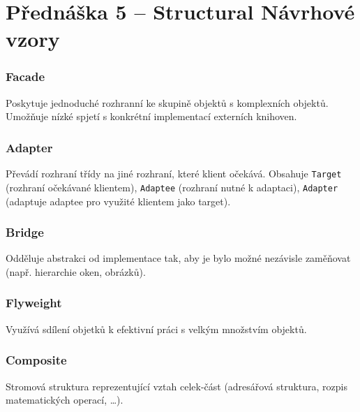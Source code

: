 \section{Přednáška 5 -- Structural Návrhové vzory}

\subsubsection{Facade}

Poskytuje jednoduché rozhranní ke skupině objektů s komplexních objektů.
Umožňuje nízké spjetí s konkrétní implementací externích knihoven.

\subsubsection{Adapter}

Převádí rozhraní třídy na jiné rozhraní, které klient očekává.
Obsahuje \texttt{Target} (rozhraní očekávané klientem), \texttt{Adaptee} (rozhraní nutné k adaptaci), \texttt{Adapter} (adaptuje adaptee pro využité klientem jako target).

\subsubsection{Bridge}

Odděluje abstrakci od implementace tak, aby je bylo možné nezávisle zaměňovat (např. hierarchie oken, obrázků).

\subsubsection{Flyweight}

Využívá sdílení objetků k efektivní práci s velkým množstvím objektů.

\subsubsection{Composite}

Stromová struktura reprezentující vztah celek-část (adresářová struktura, rozpis matematických operací, \dots).

